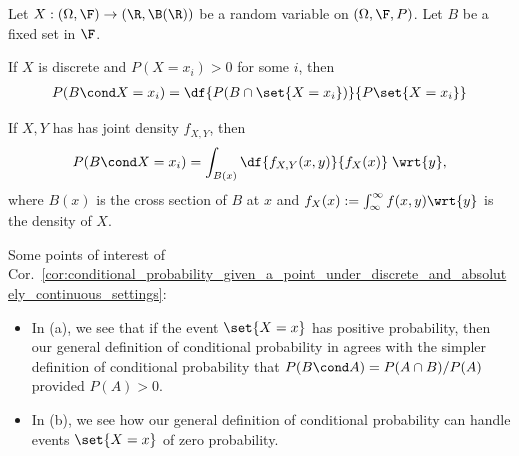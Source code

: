 \documentclass{article} %
\begin{document}
\begin{corollary}
Let $X: (\Omega, \F) \to  (\R, \B(\R))$ be a random variable on $(\Omega, \F, P)$.  Let $B$ be a fixed set in $\F$.

\begin{alphabate}
\item If $X$ is discrete and $P(X=x_i) >0$ for some $i$, then
%
\begin{align}
 P(B \cond X=x_i) = \df{P(B \cap \set{X=x_i}) }{P\set{X=x_i}} 
\label{eqn:conditional_probability_when_conditioning_variable_is_discrete}	
\end{align}
%
\item If $X,Y$ has has joint density $f_{X,Y}$, then 
%
\begin{align}
P(B \cond X=x_i) = \int_{B(x)} \df{f_{X,Y}(x,y)}{f_X(x)} \; \wrt{y}, 
\end{align}
%
where $B(x)$ is the cross section of $B$ at $x$ and $f_X(x) := \int_{\infty}^\infty f(x,y) \wrt{y}$ is the density of $X$.
\end{alphabate}
\label{cor:conditional_probability_given_a_point_under_discrete_and_absolutely_continuous_settings}	
\end{corollary}


\begin{remark}
Some points of interest of Cor.~\ref{cor:conditional_probability_given_a_point_under_discrete_and_absolutely_continuous_settings}:
\begin{itemize}
\item In (a), we see that if the event $\set{X=x}$ has positive probability, then our general definition of conditional probability in 	 agrees with the simpler definition of conditional probability \cite[Sec.4.5]{ash2000probability} that $P(B \cond A) = P(A \cap B) / P(A)$ provided $P(A) >0$.
\item In (b), we see how our general definition of conditional probability can handle events $\set{X=x}$ of zero probability.
\end{itemize}
\end{remark}
\end{document}
